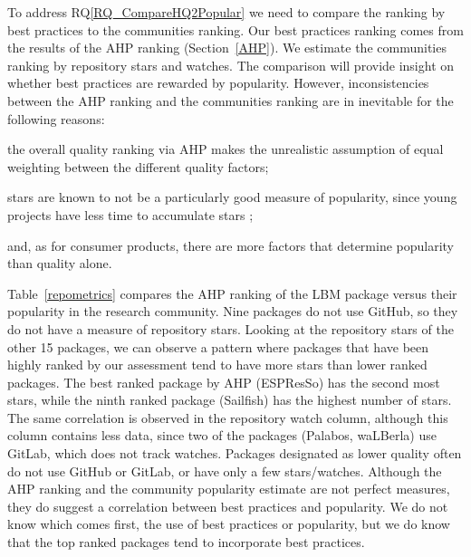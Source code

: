 \documentclass[runningheads]{llncs}
\newcommand{\rqref}[1]{RQ\ref{#1}}
\begin{document}
To address \rqref{RQ_CompareHQ2Popular} we need to compare the ranking by best
practices to the communities ranking.  Our best practices ranking comes from the
results of the AHP ranking (Section~\ref{AHP}).  We estimate the communities
ranking by repository stars and watches.  The comparison will provide insight on
whether best practices are rewarded by popularity.  However, inconsistencies
between the AHP ranking and the communities ranking are in inevitable for the
following reasons: 
\begin{inparaenum}[i)]
	\item the overall quality ranking via AHP makes the unrealistic assumption
	of equal weighting between the different quality factors;
	\item stars are known to not be a particularly good measure of popularity,
	since young projects have less time to accumulate stars \cite{}; 
	\item and, as for consumer products, there are more factors that determine
	popularity than quality alone.
\end{inparaenum}

Table~\ref{repometrics} compares the AHP ranking of the LBM package versus their
popularity in the research community.  Nine packages do not use GitHub, so they
do not have a measure of repository stars. Looking at the repository stars of
the other 15 packages, we can observe a pattern where packages that have been
highly ranked by our assessment tend to have more stars than lower ranked
packages. The best ranked package by AHP (ESPResSo) has the second most stars,
while the ninth ranked package (Sailfish) has the highest number of stars. The
same correlation is observed in the repository watch column, although this
column contains less data, since two of the packages (Palabos, waLBerla) use
GitLab, which does not track watches. Packages designated as lower quality often
do not use GitHub or GitLab, or have only a few stars/watches. Although the AHP
ranking and the community popularity estimate are not perfect measures, they do
suggest a correlation between best practices and popularity. We do not know
which comes first, the use of best practices or popularity, but we do know that
the top ranked packages tend to incorporate best practices.
\end{document}
